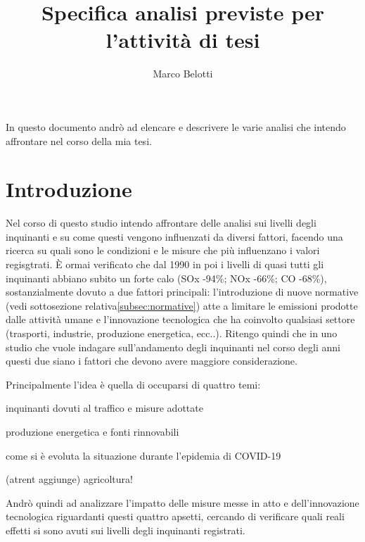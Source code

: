 \documentclass{article}
\title{Specifica analisi previste per l'attività di tesi}
\author{Marco Belotti}
\begin{document}
\maketitle
\tableofcontents
\listoftodos
\newpage

In questo documento andrò ad elencare e descrivere le varie analisi che intendo affrontare nel corso della mia tesi. 


\section{Introduzione}
\label{sec:introduzione}
Nel corso di questo studio intendo affrontare delle analisi sui livelli degli inquinanti e su come questi vengono influenzati da diversi fattori, facendo una ricerca su quali sono le condizioni e le misure che più influenzano i valori regisgtrati. È ormai verificato che dal 1990 in poi i livelli di quasi tutti gli inquinanti abbiano subito un forte calo (SOx -94\%; NOx -66\%; CO -68\%)\cite{iir2020}, sostanzialmente dovuto a due fattori principali: l'introduzione di nuove normative (vedi sottosezione relativa\ref{subsec:normative})
atte a limitare le emissioni prodotte dalle attività umane e l'innovazione tecnologica che ha coinvolto qualsiasi settore (trasporti, industrie, produzione energetica, ecc..). Ritengo quindi che in uno studio che vuole indagare sull'andamento degli inquinanti nel corso degli anni questi due siano i fattori che devono avere maggiore considerazione.

Principalmente l'idea è quella di occuparsi di quattro temi:
\begin{compactitem}
	\item inquinanti dovuti al traffico e misure adottate
	\item produzione energetica e fonti rinnovabili
	\item come si è evoluta la situazione durante l'epidemia di COVID-19
	\item (atrent aggiunge) agricoltura!
\end{compactitem}

Andrò quindi ad analizzare l'impatto delle misure messe in atto e dell'innovazione tecnologica riguardanti questi quattro apsetti, cercando di verificare quali reali effetti si sono avuti sui livelli degli inquinanti registrati.
\end{document}

